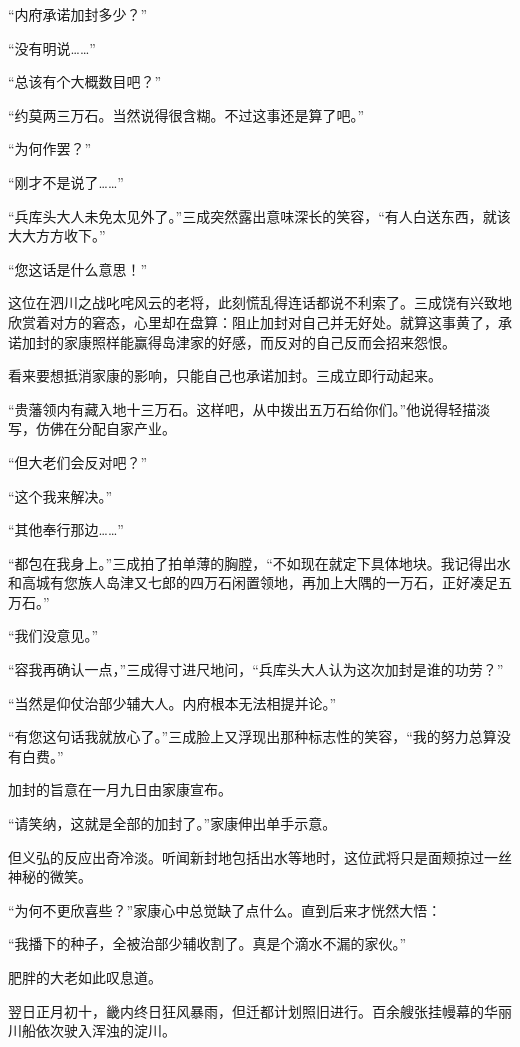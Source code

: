 \documentclass[
]{article}
\begin{document}
``内府承诺加封多少？''

``没有明说\ldots\ldots{}''

``总该有个大概数目吧？''

``约莫两三万石。当然说得很含糊。不过这事还是算了吧。''

``为何作罢？''

``刚才不是说了\ldots\ldots{}''

``兵库头大人未免太见外了。''三成突然露出意味深长的笑容，``有人白送东西，就该大大方方收下。''

``您这话是什么意思！''

这位在泗川之战叱咤风云的老将，此刻慌乱得连话都说不利索了。三成饶有兴致地欣赏着对方的窘态，心里却在盘算：阻止加封对自己并无好处。就算这事黄了，承诺加封的家康照样能赢得岛津家的好感，而反对的自己反而会招来怨恨。

看来要想抵消家康的影响，只能自己也承诺加封。三成立即行动起来。

``贵藩领内有藏入地十三万石。这样吧，从中拨出五万石给你们。''他说得轻描淡写，仿佛在分配自家产业。

``但大老们会反对吧？''

``这个我来解决。''

``其他奉行那边\ldots\ldots{}''

``都包在我身上。''三成拍了拍单薄的胸膛，``不如现在就定下具体地块。我记得出水和高城有您族人岛津又七郎的四万石闲置领地，再加上大隅的一万石，正好凑足五万石。''

``我们没意见。''

``容我再确认一点，''三成得寸进尺地问，``兵库头大人认为这次加封是谁的功劳？''

``当然是仰仗治部少辅大人。内府根本无法相提并论。''

``有您这句话我就放心了。''三成脸上又浮现出那种标志性的笑容，``我的努力总算没有白费。''

加封的旨意在一月九日由家康宣布。

``请笑纳，这就是全部的加封了。''家康伸出单手示意。

但义弘的反应出奇冷淡。听闻新封地包括出水等地时，这位武将只是面颊掠过一丝神秘的微笑。

``为何不更欣喜些？''家康心中总觉缺了点什么。直到后来才恍然大悟：

``我播下的种子，全被治部少辅收割了。真是个滴水不漏的家伙。''

肥胖的大老如此叹息道。

翌日正月初十，畿内终日狂风暴雨，但迁都计划照旧进行。百余艘张挂幔幕的华丽川船依次驶入浑浊的淀川。
\end{document}
